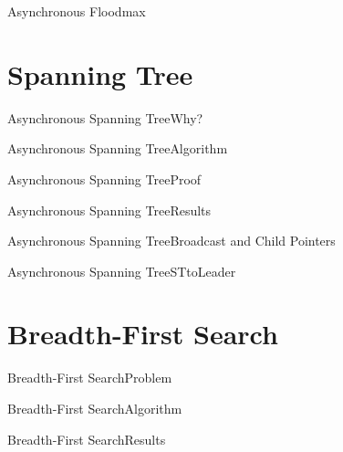 \documentclass[pdf]{beamer}
\begin{document}
\begin{frame}{Asynchronous Floodmax}
    
\end{frame}

\section{Spanning Tree}
\begin{frame}{Asynchronous Spanning Tree}{Why?}
	
\end{frame}

\begin{frame}{Asynchronous Spanning Tree}{Algorithm}

\end{frame}

\begin{frame}{Asynchronous Spanning Tree}{Proof}
	
	
\end{frame}
\begin{frame}{Asynchronous Spanning Tree}{Results}
	
	
\end{frame}

\begin{frame}{Asynchronous Spanning Tree}{Broadcast and Child Pointers}
	
	
\end{frame}

\begin{frame}{Asynchronous Spanning Tree}{STtoLeader}
	
	
\end{frame}

\section{Breadth-First Search}
\begin{frame}{Breadth-First Search}{Problem}
	
	
\end{frame}

\begin{frame}{Breadth-First Search}{Algorithm}
	
	
\end{frame}

\begin{frame}{Breadth-First Search}{Results}
	
	
\end{frame}
\end{document}
